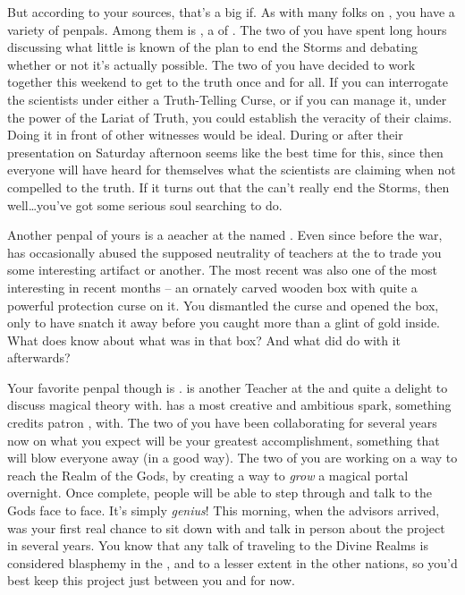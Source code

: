 \documentclass[char]{GL2020}
\begin{document}
But according to your sources, that's a big if. As with many folks on \pEarth{}, you have a variety of penpals. Among them is \cHedonist{\full}, a \cHedonist{\cleric} of \cFarmGod{}. The two of you have spent long hours discussing what little is known of the \pTech{} plan to end the Storms and debating whether or not it's actually possible. The two of you have decided to work together this weekend to get to the truth once and for all. If you can interrogate the scientists under either a Truth-Telling Curse, or if you can manage it, under the power of the Lariat of Truth, you could establish the veracity of their claims. Doing it in front of other witnesses would be ideal. During or after their presentation on Saturday afternoon seems like the best time for this, since then everyone will have heard for themselves what the scientists are claiming when not compelled to the truth. If it turns out that the \pTech{} can't really end the Storms, then well\ldots you've got some serious soul searching to do.

Another penpal of yours is a aeacher at the \pSc{} named \cChupSecond{\full}. Even since before the war, \cChupSecond{} has occasionally abused the supposed neutrality of teachers at the \pSc{} to trade you some interesting artifact \cChupSecond{\they} \cChupSecond{\have} or another. The most recent was also one of the most interesting in recent months -- an ornately carved wooden box with quite a powerful protection curse on it. You dismantled the curse and opened the box, only to have \cChupSecond{} snatch it away before you caught more than a glint of gold inside. What does \cChupSecond{} know about what was in that box? And what did \cChupSecond{\they} do with it afterwards?

Your favorite penpal though is \cFlowPriest{\full}. \cFlowPriest{} is another Teacher at the \pSchool{} and quite a delight to discuss magical theory with. \cFlowPriest{} has a most creative and ambitious spark, something \cFlowPriest{\they} credits \cFlowPriest{\their} patron \cFlow{\God}, \cFlowFull{\full} with. The two of you have been collaborating for several years now on what you expect will be your greatest accomplishment, something that will blow everyone away (in a good way). The two of you are working on a way to reach the Realm of the Gods, by creating a way to \emph{grow} a magical portal overnight. Once complete, people will be able to step through and talk to the Gods face to face. It's simply \emph{genius}! This morning, when the advisors arrived, was your first real chance to sit down with \cFlowPriest{} and talk in person about the project in several years. You know that any talk of traveling to the Divine Realms is considered blasphemy in the \pFarm{}, and to a lesser extent in the other nations, so you'd best keep this project just between you and \cFlowPriest{} for now.
\end{document}
